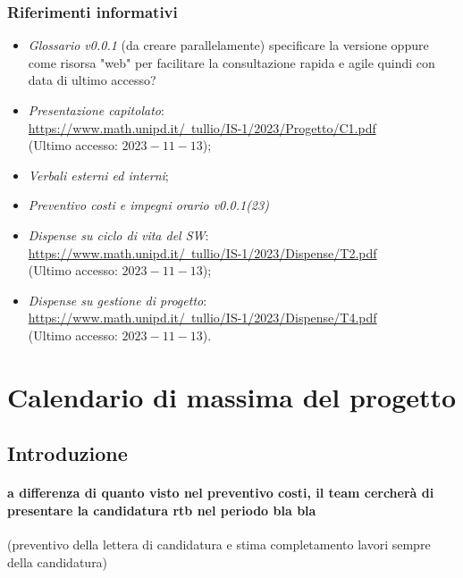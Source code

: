 \documentclass[10pt, a4paper]{article}
\begin{document}
\subsubsection{Riferimenti informativi}
\begin{itemize}
    \item \textit{Glossario v0.0.1} (da creare parallelamente) specificare la versione oppure come risorsa "web" per facilitare la consultazione rapida e agile quindi con data di ultimo accesso?
   
    \item \textit{Presentazione capitolato}:\\
    \href{https://www.math.unipd.it/~tullio/IS-1/2023/Progetto/C1.pdf}{https://www.math.unipd.it/~tullio/IS-1/2023/Progetto/C1.pdf}\\
    (Ultimo accesso: $2023-11-13$);   
    
    \item \textit{Verbali esterni ed interni};
    \item \textit{Preventivo costi e impegni orario v0.0.1(23)}
    
    \item \textit{Dispense su ciclo di vita del SW}:\\
    \href{https://www.math.unipd.it/~tullio/IS-1/2023/Dispense/T2.pdf}{https://www.math.unipd.it/~tullio/IS-1/2023/Dispense/T2.pdf}\\
    (Ultimo accesso: $2023-11-13$);
    
    \item  \textit{Dispense su gestione di progetto}:\\
    \href{https://www.math.unipd.it/~tullio/IS-1/2023/Dispense/T4.pdf}{https://www.math.unipd.it/~tullio/IS-1/2023/Dispense/T4.pdf}\\
    (Ultimo accesso: $2023-11-13$).
\end{itemize}

\section{Calendario di massima del progetto}
\subsection{Introduzione}
\paragraph{a  differenza di quanto visto nel preventivo costi,  il team cercherà di presentare la candidatura rtb nel periodo bla bla}
(preventivo  della lettera di candidatura e stima completamento lavori sempre della candidatura)
\end{document}
